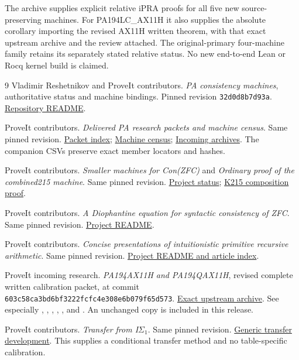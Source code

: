 \documentclass[11pt,a4paper]{article}
\newcommand{\repourl}{https://github.com/VladimirReshetnikov/ProveIt/tree/32d0d8b7d93a63ad4106c18cdb29b37927acdad2}
\begin{document}
The archive supplies explicit relative iPRA proofs for all five new
source-preserving machines. For PA194LC\_AX11H it also supplies the
absolute corollary importing the revised AX11H written theorem, with
that exact upstream archive and the review attached. The original-primary
four-machine family retains its separately stated relative status.
No new end-to-end Lean or Rocq kernel build is claimed.

\begin{thebibliography}{9}
Vladimir Reshetnikov and ProveIt contributors.
\emph{PA consistency machines}, authoritative status and machine bindings.
Pinned revision \texttt{32d0d8b7d93a}.
\href{\repourl/Computability/BusyBeaver/Research/PA/README.md}{Repository README}.

ProveIt contributors. \emph{Delivered PA research packets and machine census}.
Same pinned revision.
\href{\repourl/Computability/BusyBeaver/Research/PA/docs/README.md}{Packet index};
\href{\repourl/Computability/BusyBeaver/Research/PA/docs/MACHINES.md}{Machine census};
\href{\repourl/docs/incoming}{Incoming archives}.
The companion CSVs preserve exact member locators and hashes.

ProveIt contributors. \emph{Smaller machines for Con(ZFC)} and
\emph{Ordinary proof of the combined215 machine}. Same pinned revision.
\href{\repourl/Computability/BusyBeaver/Research/ZFC/README.md}{Project status};
\href{\repourl/Computability/BusyBeaver/Research/ZFC/candidate-k215/proof.md}{K215 composition proof}.

ProveIt contributors. \emph{A Diophantine equation for syntactic consistency
of ZFC}. Same pinned revision.
\href{\repourl/Computability/DiophantineConsistency/README.md}{Project README}.

ProveIt contributors. \emph{Concise presentations of intuitionistic
primitive recursive arithmetic}. Same pinned revision.
\href{\repourl/Logic/PrimitiveRecursiveArithmetic/ConciseIPRA/README.md}{Project README and article index}.

ProveIt incoming research. \emph{PA194AX11H and PA194QAX11H}, revised
complete written calibration packet, at commit
\texttt{603c58ca3bd6bf3222fcfc4e308e6b079f65d573}.
\href{https://github.com/VladimirReshetnikov/ProveIt/blob/603c58ca3bd6bf3222fcfc4e308e6b079f65d573/docs/incoming/pa194_ax11h_research_2026-11-14.zip}{Exact upstream archive}.
See especially ,
,
,
,
, and
.
An unchanged copy is included in this release.

ProveIt contributors. \emph{Transfer from I$\Sigma_1$}.
Same pinned revision.
\href{\repourl/Computability/BusyBeaver/Research/PA/isigma1-transfer/README.md}{Generic transfer development}.
This supplies a conditional transfer method and no table-specific calibration.
\end{thebibliography}

\clearpage
\appendix

\clearpage

\clearpage

\clearpage

\clearpage

\end{document}
